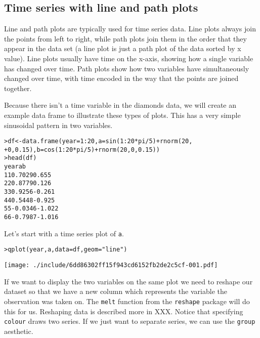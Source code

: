 \subsection{Time series with line and path plots}\label{sub:line_plot}

Line and path plots are typically used for time series data.  Line plots always join the points from left to right, while path plots join them in the order that they appear in the data set (a line plot is just a path plot of the data sorted by x value).  Line plots usually have time on the x-axis, showing how a single variable has changed over time.  Path plots show how two variables have simultaneously changed over time, with time encoded in the way that the points are joined together.

Because there isn't a time variable in the diamonds data, we will create an example data frame to illustrate these types of plots.  This has a very simple sinusoidal pattern in two variables.

\begin{alltt}
> df <- data.frame(year = 1:20, a = sin(1:20 * pi/5) + rnorm(20, 
+     0, 0.15), b = cos(1:20 * pi/5) + rnorm(20, 0, 0.15))
> head(df)
  year       a      b
1    1  0.7029  0.655
2    2  0.8779  0.126
3    3  0.9256 -0.261
4    4  0.5448 -0.925
5    5 -0.0346 -1.022
6    6 -0.7987 -1.016

\end{alltt}

Let's start with a time series plot of {\tt a}.

\begin{alltt}
> qplot(year, a, data = df, geom = "line")
\end{alltt}
\texttt{[image: ./include/6dd86302ff15f943cd6152fb2de2c5cf-001.pdf]}
\begin{alltt}

\end{alltt}

If we want to display the two variables on the same plot we need to reshape our dataset so that we have a new column which represents the variable the observation was taken on.  The {\tt melt} function from the {\tt reshape} package will do this for us.  Reshaping data is described more in XXX.  Notice that specifying {\tt colour} draws two series.  If we just want to separate series, we can use the {\tt group} aesthetic.

